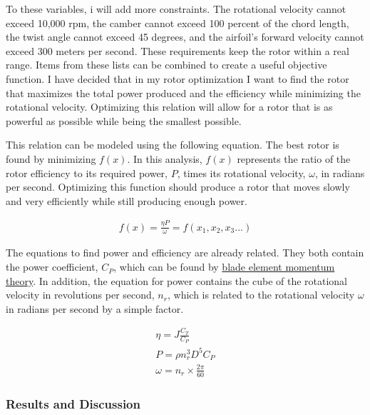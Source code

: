 \documentclass{article}
\begin{document}
To these variables, i will add more constraints. The rotational velocity cannot exceed 10,000 rpm, the camber cannot exceed 100 percent of the chord length, the twist angle cannot exceed 45 degrees, and the airfoil's forward velocity cannot exceed 300 meters per second. These requirements keep the rotor within a real range. Items from these lists can be combined to create a useful objective function. I have decided that in my rotor optimization I want to find the rotor that maximizes the total power produced and the efficiency while minimizing the rotational velocity. Optimizing this relation will allow for a rotor that is as powerful as possible while being the smallest possible.

This relation can be modeled using the following equation. The best rotor is found by minimizing $f(x)$. In this analysis, $f(x)$ represents the ratio of the rotor efficiency to its required power, $P$, times its rotational velocity, $\omega$, in radians per second. Optimizing this function should produce a rotor that moves slowly and very efficiently while still producing enough power.

\begin{equation}
\begin{aligned}
	f(x) = \frac{\eta P}{\omega} = f(x_{1}, x_{2}, x_{3}...)
\end{aligned}
\end{equation}

The equations to find power and efficiency are already related. They both contain the power coefficient, $C_{P}$, which can be found by \hyperlink{BEM}{blade element momentum theory}. In addition, the equation for power contains the cube of the rotational velocity in revolutions per second, $n_{r}$, which is related to the rotational velocity $\omega$ in radians per second by a simple factor.

\begin{equation}
\begin{aligned}
	\eta = J \frac{C_{T}}{C_{P}} \\
	P = \rho n_{r}^{3} D^{5} C_{P} \\
	\omega = n_{r} \times \frac{2 \pi}{60}
\end{aligned}
\end{equation}

\subsubsection*{Results and Discussion}
\end{document}
